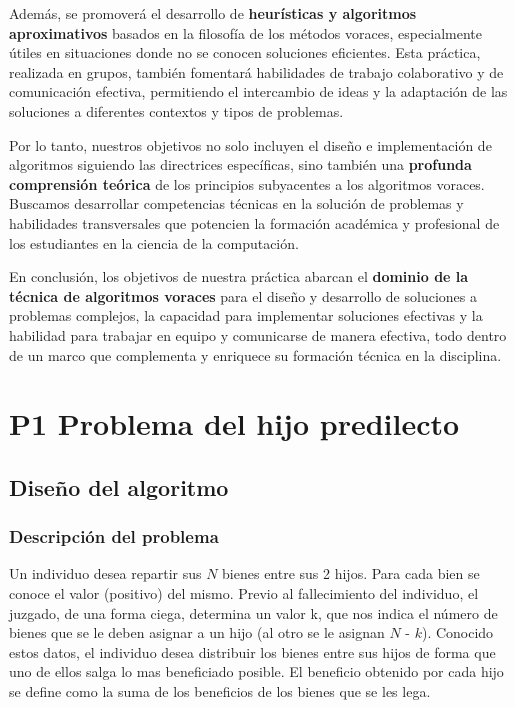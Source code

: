 \documentclass{article}
\begin{document}
Además, se promoverá el desarrollo de \textbf{heurísticas y algoritmos aproximativos} basados en la filosofía de los métodos voraces, especialmente útiles en situaciones donde no se conocen soluciones eficientes. Esta práctica, realizada en grupos, también fomentará habilidades de trabajo colaborativo y de comunicación efectiva, permitiendo el intercambio de ideas y la adaptación de las soluciones a diferentes contextos y tipos de problemas.

Por lo tanto, nuestros objetivos no solo incluyen el diseño e implementación de algoritmos siguiendo las directrices específicas, sino también una \textbf{profunda comprensión teórica} de los principios subyacentes a los algoritmos voraces. Buscamos desarrollar competencias técnicas en la solución de problemas y habilidades transversales que potencien la formación académica y profesional de los estudiantes en la ciencia de la computación.

En conclusión, los objetivos de nuestra práctica abarcan el \textbf{dominio de la técnica de algoritmos voraces} para el diseño y desarrollo de soluciones a problemas complejos, la capacidad para implementar soluciones efectivas y la habilidad para trabajar en equipo y comunicarse de manera efectiva, todo dentro de un marco que complementa y enriquece su formación técnica en la disciplina.



\newpage

\section{P1 Problema del hijo predilecto}
\subsection{Diseño del algoritmo}
\subsubsection{Descripción del problema}
Un individuo desea repartir sus $N$ bienes entre sus 2 hijos. Para cada bien se conoce el valor (positivo) del mismo. Previo al fallecimiento del individuo, el juzgado, de una forma ciega, determina un valor k, que nos indica el número de bienes que se le deben asignar a un hijo (al otro se le asignan $N$ - $k$). Conocido estos datos, el individuo desea distribuir los bienes entre sus hijos de forma que uno de ellos salga lo mas beneficiado posible. El beneficio obtenido por cada hijo se define como la suma de los beneficios de los bienes que se les lega.
\end{document}
